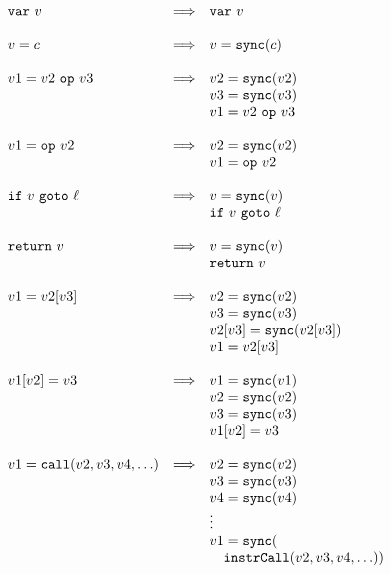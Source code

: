 \documentclass{sig-alternate}
\newcommand \dsl [1] {\ensuremath{{\tt #1}}\xspace}
\newcommand \Sync{\dsl{sync}}
\begin{document}
\begin{figure}
{\scriptsize\[
\begin{array}{lrl}
   \dsl{var}\ v& \Longrightarrow & \dsl{var}\ v\\
& & \\
    v = c & \Longrightarrow & v = \Sync(c)\\
& & \\
    v1 = v2\ \dsl{op}\ v3 & \Longrightarrow & v2 = \Sync(v2)\\
& & v3 = \Sync(v3)\\
& & v1 = v2\ \dsl{op}\ v3\\
& & \\
    v1 = \dsl{op}\ v2 & \Longrightarrow & v2 = \Sync(v2)\\
& & v1 = \dsl{op}\ v2\\
& & \\
    \dsl{if}\ v \ \dsl{goto}\ \ell & \Longrightarrow & v = \Sync(v)\\
    & & \dsl{if}\ v \ \dsl{goto}\ \ell \\
& & \\
    \dsl{return}\ v & \Longrightarrow & v = \Sync(v)\\
    & & \dsl{return}\ v \\
& & \\
    v1 = v2[v3] & \Longrightarrow & v2 =\Sync(v2)\\
& & v3 = \Sync(v3)\\
& & v2[v3] = \Sync(v2[v3])\\
& & v1 = v2[v3]\\
& & \\
    v1[v2] = v3 & \Longrightarrow & v1 = \Sync(v1)\\
& & v2 = \Sync(v2)\\
& & v3 = \Sync(v3)\\
& & v1[v2] = v3\\
& & \\
    v1 = \dsl{call}(v2, v3, v4, \ldots) & \Longrightarrow & v2 = \Sync(v2)\\
& & v3 = \Sync(v3)\\
& & v4 = \Sync(v4)\\
& & \vdots \\
& & v1 = \Sync(\\
& &\quad\dsl{instrCall}(v2, v3, v4, \ldots))\\
& & \\

\end{array}\]}
\end{figure}
\end{document}
